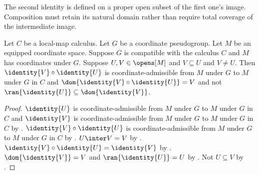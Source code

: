 The second identity is defined on a proper open subset of the first one's
image. Composition must retain its natural domain rather than require total
coverage of the intermediate image.

\begin{theorem}\label{coordinate_identity_proper_composition}
    Let $C$ be a local-map calculus.
    Let $G$ be a coordinate pseudogroup.
    Let $M$ be an equipped coordinate space.
    Suppose $G$ is compatible with the calculus $C$ and $M$ has coordinates under $G$.
    Suppose $U,V\in\opens[M]$ and $V\subseteq U$ and $V\neq U$.
    Then $\identity{V}\circ\identity{U}$ is coordinate-admissible
        from $M$ under $G$ to $M$ under $G$ in $C$
        and $\dom{\identity{V}\circ\identity{U}}=V$
        and not $\ran{\identity{U}}\subseteq\dom{\identity{V}}$.
\end{theorem}
\begin{proof}
    $\identity{U}$ is coordinate-admissible from $M$ under $G$ to $M$ under $G$ in $C$ and
        $\identity{V}$ is coordinate-admissible from $M$ under $G$ to $M$ under $G$ in $C$ by
        .
    $\identity{V}\circ\identity{U}$ is coordinate-admissible
        from $M$ under $G$ to $M$ under $G$ in $C$ by .
    $U\inter V=V$ by .
    $\identity{V}\circ\identity{U}=\identity{V}$ by .
    $\dom{\identity{V}}=V$ and $\ran{\identity{U}}=U$ by .
    Not $U\subseteq V$ by .
\end{proof}
